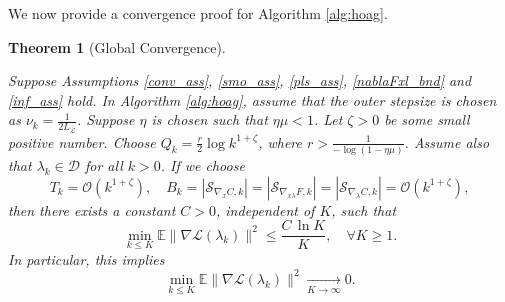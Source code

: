 \documentclass[11pt, twoside]{report}
\newtheorem{theorem}{Theorem}[section]
\begin{document}
We now provide a convergence proof for Algorithm \ref{alg:hoag}.

\begin{theorem}[Global Convergence] \label{hoag_thm_glcv}

Suppose Assumptions \ref{conv_ass}, \ref{smo_ass}, \ref{pls_ass}, \ref{nablaFxl_bnd} and \ref{inf_ass} hold.
In Algorithm \ref{alg:hoag}, assume that the outer stepsize is chosen as $\nu_k = \frac{1}{2L_\mathcal{L}}$. Suppose $\eta$ is chosen such that $\eta \mu < 1$. Let $\zeta > 0$ be some small positive number. Choose $Q_k = \frac{r}{2}\log{k^{1+\zeta}}$, where $r > \frac{1}{-\log(1-\eta\mu)}$. Assume also that $\lambda_k \in \mathcal{D}$ for all $k>0$.
If we choose
\begin{equation}\label{params_conv}
    T_k = \mathcal{O}(k^{1+\zeta}), \quad 
    B_k = |\mathcal{S}_{\nabla_x C,k}| = |\mathcal{S}_{\nabla_{x\lambda} F,k}| = |\mathcal{S}_{\nabla_\lambda C,k}| = \mathcal{O}(k^{1+\zeta}),
\end{equation}
then there exists a constant $C > 0$, independent of $K$, such that
\begin{equation}
\min_{k \le K} \mathbb{E}\|\nabla \mathcal{L}(\lambda_k)\|^2 \le \frac{C \, \ln K}{K}, \quad \forall K \ge 1.
\end{equation}
In particular, this implies
\[
\min_{k \leq K} \mathbb{E}\|\nabla \mathcal{L}(\lambda_k)\|^2 \xrightarrow[K \to \infty]{} 0.
\]
\end{theorem}
\end{document}
